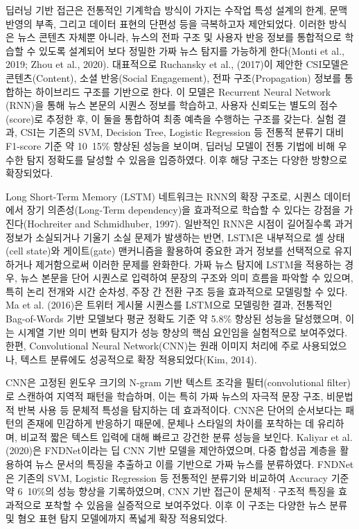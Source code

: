 \documentclass[a4paper,fleqn]{cas-sc}
\begin{document}
딥러닝 기반 접근은 전통적인 기계학습 방식이 가지는 수작업 특성 설계의 한계, 문맥 반영의 부족, 그리고 데이터 표현의 단편성 등을 극복하고자 제안되었다. 이러한 방식은 뉴스 콘텐츠 자체뿐 아니라, 뉴스의 전파 구조 및 사용자 반응 정보를 통합적으로 학습할 수 있도록 설계되어 보다 정밀한 가짜 뉴스 탐지를 가능하게 한다(Monti et al., 2019; Zhou et al., 2020).
대표적으로 Ruchansky et al., (2017)이 제안한 CSI모델은 콘텐츠(Content), 소셜 반응(Social Engagement), 전파 구조(Propagation) 정보를 통합하는 하이브리드 구조를 기반으로 한다. 이 모델은 Recurrent Neural Network (RNN)을 통해 뉴스 본문의 시퀀스 정보를 학습하고, 사용자 신뢰도는 별도의 점수(score)로 추정한 후, 이 둘을 통합하여 최종 예측을 수행하는 구조를 갖는다. 실험 결과, CSI는 기존의 SVM, Decision Tree, Logistic Regression 등 전통적 분류기 대비 F1-score 기준 약 10~15\% 향상된 성능을 보이며, 딥러닝 모델이 전통 기법에 비해 우수한 탐지 정확도를 달성할 수 있음을 입증하였다. 이후 해당 구조는 다양한 방향으로 확장되었다.

Long Short-Term Memory (LSTM) 네트워크는 RNN의 확장 구조로, 시퀀스 데이터에서 장기 의존성(Long-Term dependency)을 효과적으로 학습할 수 있다는 강점을 가진다(Hochreiter and Schmidhuber, 1997). 일반적인 RNN은 시점이 길어질수록 과거 정보가 소실되거나 기울기 소실 문제가 발생하는 반면, LSTM은 내부적으로 셀 상태(cell state)와 게이트(gate) 맨커니즘을 활용하여 중요한 과거 정보를 선택적으로 유지하거나 제거함으로써 이러한 문제를 완화한다. 가짜 뉴스 탐지에 LSTM을 적용하는 경우, 뉴스 본문을 단어 시퀀스로 입력하여 문장의 구조와 의미 흐름을 파악할 수 있으며, 특히 논리 전개와 시간 순차성, 주장 간 전환 구조 등을 효과적으로 모델링할 수 있다. Ma et al. (2016)은 트위터 게시물 시퀀스를 LSTM으로 모델링한 결과, 전통적인 Bag-of-Words 기반 모델보다 평균 정확도 기준 약 5.8\% 향상된 성능을 달성했으며, 이는 시계열 기반 의미 변화 탐지가 성능 향상의 핵심 요인임을 실험적으로 보여주었다.
한편, Convolutional Neural Network(CNN)는 원래 이미지 처리에 주로 사용되었으나, 텍스트 분류에도 성공적으로 확장 적용되었다(Kim, 2014). 

CNN은 고정된 윈도우 크기의 N-gram 기반 텍스트 조각을 필터(convolutional filter)로 스캔하여 지역적 패턴을 학습하며, 이는 특히 가짜 뉴스의 자극적 문장 구조, 비문법적 반복 사용 등 문체적 특성을 탐지하는 데 효과적이다. CNN은 단어의 순서보다는 패턴의 존재에 민감하게 반응하기 때문에, 문체나 스타일의 차이를 포착하는 데 유리하며, 비교적 짧은 텍스트 입력에 대해 빠르고 강건한 분류 성능을 보인다. Kaliyar et al. (2020)은 FNDNet이라는 딥 CNN 기반 모델을 제안하였으며, 다중 합성곱 계층을 활용하여 뉴스 문서의 특징을 추출하고 이를 기반으로 가짜 뉴스를 분류하였다. FNDNet은 기존의 SVM, Logistic Regression 등 전통적인 분류기와 비교하여 Accuracy 기준 약 6~10\%의 성능 향상을 기록하였으며, CNN 기반 접근이 문체적·구조적 특징을 효과적으로 포착할 수 있음을 실증적으로 보여주었다. 이후 이 구조는 다양한 뉴스 분류 및 혐오 표현 탐지 모델에까지 폭넓게 확장 적용되었다.
\end{document}

